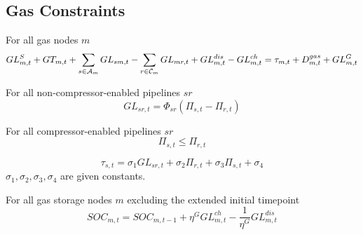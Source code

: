 \subsection{Gas Constraints}

For all gas nodes $m$ \atallt{}
\begin{equation}
  GL^S_{m,t} + GT_{m,t} + \sum_{s\in \mathcal A_m}{GL_{sm,t}} - \sum_{r\in
    \mathcal C_m}{GL_{mr,t}} + GL^{dis}_{m,t} - GL^{ch}_{m,t} = \tau_{m,t} +
  D^{gas}_{m,t} + GL^G_{m,t}
\end{equation}



For all non-compressor-enabled pipelines $sr$ \atallt{}
\begin{equation}
  GL_{sr,t} = \Phi_{sr}(\Pi_{s,t} - \Pi_{r,t})
\end{equation}



For all compressor-enabled pipelines $sr$ \atallt{}
\begin{equation}
  \Pi_{s,t} \leq \Pi_{r,t}
\end{equation}

\begin{equation}
  \tau_{s,t} = \sigma_1 GL_{sr,t} + \sigma_2 \Pi_{r,t} + \sigma_3 \Pi_{s,t} +
  \sigma_4
\end{equation}
$\sigma_1, \sigma_2, \sigma_3, \sigma_4$ are given constants.



For all gas storage nodes $m$ \atallextt{} excluding the extended initial
timepoint
\begin{equation}
  SOC_{m,t} = SOC_{m,t-1} + \eta^G GL^{ch}_{m,t} - \frac{1}{\eta^G}
  GL^{dis}_{m,t}
\end{equation}
